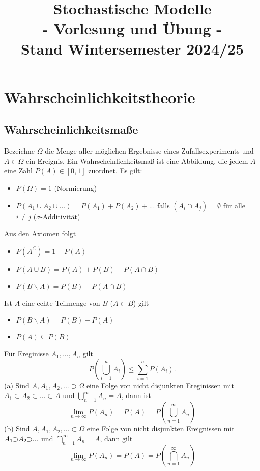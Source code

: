 \documentclass[a4paper,12pt]{article}
\title{\textbf{Stochastische Modelle} \\ \vspace{10pt} \normalsize - Vorlesung und Übung - \\ \vspace{10pt} \footnotesize Stand Wintersemester 2024/25}
\author{}
\date{}
\begin{document}
\maketitle
\newpage

\renewcommand{\contentsname}{Inhaltsverzeichnis}
\tableofcontents
\newpage

\section{Wahrscheinlichkeitstheorie}
\subsection{Wahrscheinlichkeitsmaße}
Bezeichne $\Omega$ die Menge aller möglichen Ergebnisse eines Zufallsexperiments und $A \in \Omega$ ein Ereignis.
Ein Wahrscheinlichkeitsmaß ist eine Abbildung, die jedem $A$ eine Zahl $P(A) \in [0,1]$ zuordnet. Es gilt:
\begin{itemize}
	\item $P(\Omega) = 1 $ (Normierung)
	\item $P(A_1 \cup A_2 \cup ...) = P(A_1) + P(A_2) + ...$ falls $(A_i \cap A_j) = \emptyset$ für alle $i \neq j$ ($\sigma$-Additivität)
\end{itemize}
Aus den Axiomen folgt
\begin{itemize}
	\item $P(A^C) = 1- P(A)$
	\item $P(A \cup B) = P(A) + P(B) - P(A \cap B)$
	\item $P(B \backslash A) = P(B) - P(A\cap B)$
\end{itemize}
Ist $A$ eine echte Teilmenge von $B$ ($A \subset B$) gilt
\begin{itemize}
	\item $P(B \backslash A)= P(B) - P(A)$
	\item $P(A) \subseteq P(B)$
\end{itemize}
Für Ereginisse $A_1, ..., A_n$ gilt
$$
	P \left( \bigcup_{i=1}^nA_i \right) \leq \sum_{i=1}^{n}P(A_i)
	.$$
(a) Sind $A, A_1, A_2, ... \supset \Omega$ eine Folge von nicht disjunkten Ereginissen mit $A_1 \subset A_2 \subset ... \subset A$ und $\bigcup_{n=1}^\infty A_n = A$, dann ist
$$
	\lim_{n \to \infty} P(A_n) = P(A) = P \left(  \bigcup_{n=1}^\infty A_n \right)
$$
(b) Sind $A, A_1, A_2, ... \subset \Omega$ eine Folge von nicht disjunkten Ereignissen mit $A_1 \reflectbox{$\subset$} A_2 \reflectbox{$\subset$} ...$ und $\bigcap_{n=1}^\infty A_n = A$, dann gilt
$$
	\lim_{n \to \infty} P(A_n) = P(A) = P \left(  \bigcap_{n=1}^\infty A_n \right)
$$
\end{document}
